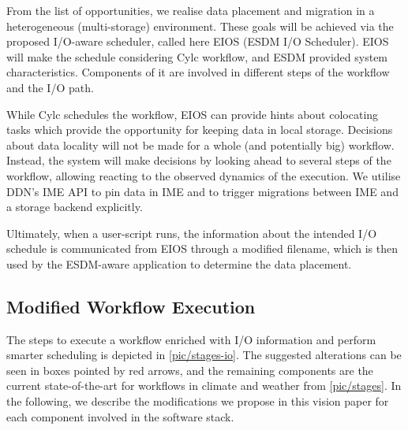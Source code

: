 \documentclass{superfri}
\begin{document}
From the list of opportunities, we realise data placement and migration in a heterogeneous (multi-storage) environment.
These goals will be achieved via the proposed I/O-aware scheduler, called here EIOS (ESDM I/O Scheduler).
EIOS will make the schedule considering Cylc workflow, and ESDM provided system characteristics.
Components of it are involved in different steps of the workflow and the I/O path.

While Cylc schedules the workflow, EIOS can provide hints about colocating tasks which provide the opportunity for keeping data in local storage.
Decisions about data locality will not be made for a whole (and potentially big) workflow.
Instead, the system will make decisions by looking ahead to several steps of the workflow, allowing reacting to the observed dynamics of the execution.
We utilise DDN's IME API to pin data in IME and to trigger migrations between IME and a storage backend explicitly.

Ultimately, when a user-script runs, the information about the intended I/O schedule is communicated from EIOS through a modified filename, which is then used by the ESDM-aware application to determine the data placement.

\subsection{Modified Workflow Execution}

The steps to execute a workflow enriched with I/O information and perform smarter scheduling is depicted in \cref{pic/stages-io}.
The suggested alterations can be seen in boxes pointed by red arrows, and the remaining components are the current state-of-the-art for workflows in climate and weather from \cref{pic/stages}.
In the following, we describe the modifications we propose in this vision paper for each component involved in the software stack.

\end{document}
